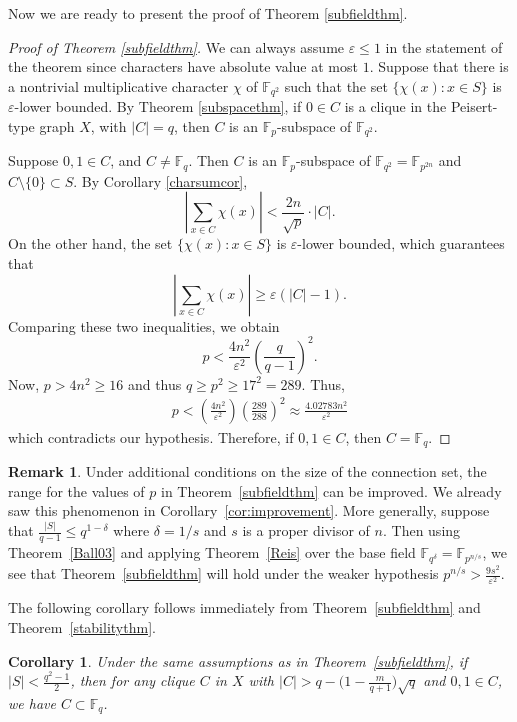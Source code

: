 \documentclass[12pt,reqno]{amsart}
\newtheorem{cor}[thm]{Corollary}
\theoremstyle{definition}
\newtheorem{rem}[thm]{Remark}
\newcommand{\F}{\mathbb{F}}
\begin{document}
Now we are ready to present the proof of Theorem \ref{subfieldthm}.

\begin{proof}[Proof of Theorem \ref{subfieldthm}]
We can always assume $\varepsilon\leq 1$ in the statement of the theorem since characters have absolute value at most $1$. Suppose that there is a nontrivial multiplicative character $\chi$ of $\F_{q^2}$ such that the set $\{\chi(x): x \in S\}$ is $\varepsilon$-lower bounded. 
By Theorem \ref{subspacethm}, if $0\in C$ is a clique in the Peisert-type graph $X$, with $|C|=q$, then $C$ is an $\F_p$-subspace of $\F_{q^2}$. 

Suppose $0,1 \in C$, and $C \neq \F_q$. Then $C$ is an $\F_p$-subspace of $\F_{q^2}=\F_{p^{2n}}$ and $C\setminus \{0\} \subset S$. By Corollary \ref{charsumcor}, 
\[
\left|\sum_{x \in C} \chi(x)\right|< \frac{2n}{\sqrt{p}} \cdot |C|.    
\]
On the other hand, the set $\{\chi(x): x \in S\}$ is $\varepsilon$-lower bounded, which guarantees that
$$
\left|\sum_{x \in C} \chi(x)\right| \geq \varepsilon(|C|-1).
$$
Comparing these two inequalities, we obtain
$$
p < \frac{4n^2}{\varepsilon^2} \left(\frac{q}{q-1}\right)^2. 
$$
Now, $p>4n^2\geq 16$ and thus $q\geq p^2 \geq 17^2=289$. Thus, 
\begin{align*}
p<\left(\frac{4n^2}{\varepsilon^2}\right)\left(\frac{289}{288}\right)^2\approx \frac{4.02783n^2}{\varepsilon^2}
\end{align*} which contradicts our hypothesis. Therefore, if $0,1 \in C$, then $C=\F_q$. 
\end{proof}

\begin{rem}
Under additional conditions on the size of the connection set, the range for the values of $p$ in Theorem~\ref{subfieldthm} can be improved. We already saw this phenomenon in Corollary~\ref{cor:improvement}. More generally, suppose that $\frac{|S|}{q-1}\leq q^{1-\delta}$ where $\delta=1/s$ and $s$ is a proper divisor of $n$. Then using Theorem~\ref{Ball03} and applying Theorem~\ref{Reis} over the base field $\F_{q^{\delta}}=\F_{p^{n/s}}$, we see that Theorem~\ref{subfieldthm} will hold under the weaker hypothesis $p^{n/s} > \frac{9s^2}{\varepsilon^2}$.
\end{rem}


The following corollary follows immediately from Theorem~\ref{subfieldthm} and Theorem~\ref{stabilitythm}.

\begin{cor}
Under the same assumptions as in Theorem~\ref{subfieldthm}, if $|S|<\frac{q^2-1}{2}$, then for any clique $C$ in $X$ with $|C|>q-\big(1-\frac{m}{q+1}\big)\sqrt{q}$ and $0,1 \in C$, we have $C \subset \F_q$.
\end{cor}
\end{document}
